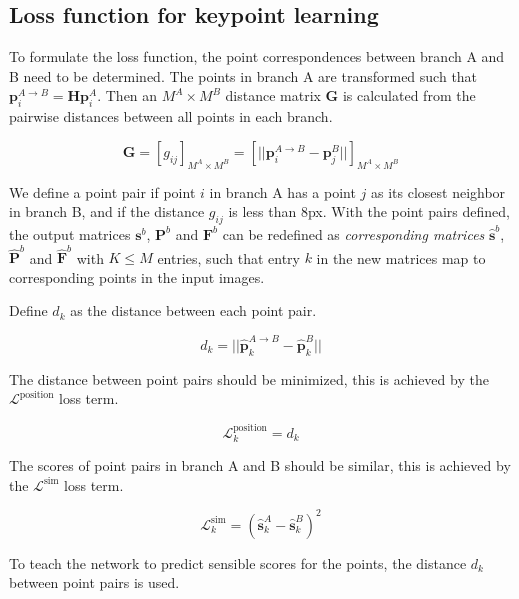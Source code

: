 \subsection{Loss function for keypoint learning}\label{sec:keypointloss}

To formulate the loss function, the point correspondences between branch A and B need to be determined. The points in branch A are transformed such that $\textbf{p}_i^{A\rightarrow B}=\textbf{H}\textbf{p}_i^A$. Then an $M^A\times M^B$ distance matrix $\textbf{G}$ is calculated from the pairwise distances between all points in each branch.

\begin{equation}
\textbf{G}=[g_{ij}]_{M^A\times M^B}=\left[||\textbf{p}_i^{A\rightarrow B}-\textbf{p}_j^B||\right]_{M^A\times M^B}
\end{equation}

We define a point pair if point $i$ in branch A has a point $j$ as its closest neighbor in branch B, and if the distance $g_{ij}$ is less than 8px. With the point pairs defined, the output matrices $\textbf{s}^b$, $\textbf{P}^b$ and $\textbf{F}^b$ can be redefined as \textit{corresponding matrices} $\hat{\textbf{s}}^b$, $\hat{\textbf{P}}^b$ and $\hat{\textbf{F}}^b$ with $K\le M$ entries, such that entry $k$ in the new matrices map to corresponding points in the input images.

Define $d_k$ as the distance between each point pair.

\begin{equation}
d_k=||\hat{\textbf{p}}_k^{A\rightarrow B}-\hat{\textbf{p}}_k^B||
\end{equation}

The distance between point pairs should be minimized, this is achieved by the $\mathcal{L}^{\textrm{position}}$ loss term.

\begin{equation}
\mathcal{L}_k^{\textrm{position}} = d_k
\end{equation}

The scores of point pairs in branch A and B should be similar, this is achieved by the $\mathcal{L}^{\textrm{sim}}$ loss term.

\begin{equation}
\mathcal{L}_k^{\textrm{sim}} = \left(\hat{\textbf{s}}_k^{A}-\hat{\textbf{s}}_k^B\right)^2
\end{equation}

To teach the network to predict sensible scores for the points, the distance $d_k$ between point pairs is used.

